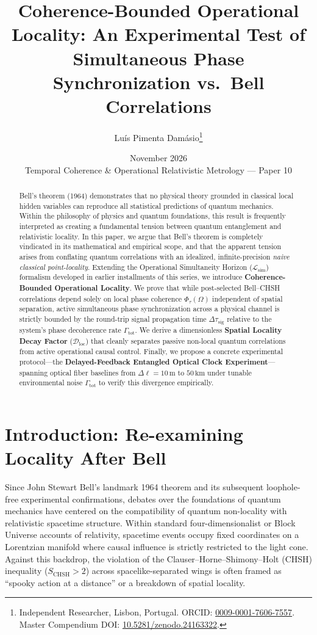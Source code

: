 \documentclass[11pt,a4paper]{article}
\title{\textbf{Coherence-Bounded Operational Locality: An Experimental Test of Simultaneous Phase Synchronization vs.\ Bell Correlations}}
\author{
    Lu\'{i}s Pimenta Dam\'{a}sio\thanks{Independent Researcher, Lisbon, Portugal. ORCID: \href{https://orcid.org/0009-0001-7606-7557}{0009-0001-7606-7557}. Master Compendium DOI: \href{https://doi.org/10.5281/zenodo.24163322}{10.5281/zenodo.24163322}.}
}
\date{November 2026 \\ \small Temporal Coherence \& Operational Relativistic Metrology --- Paper 10}
\begin{document}
\maketitle

\begin{abstract}
Bell's theorem (1964) demonstrates that no physical theory grounded in classical local hidden variables can reproduce all statistical predictions of quantum mechanics. Within the philosophy of physics and quantum foundations, this result is frequently interpreted as creating a fundamental tension between quantum entanglement and relativistic locality. In this paper, we argue that Bell's theorem is completely vindicated in its mathematical and empirical scope, and that the apparent tension arises from conflating quantum correlations with an idealized, infinite-precision \emph{naive classical point-locality}. Extending the Operational Simultaneity Horizon ($\mathcal{L}_{\mathrm{sim}}$) formalism developed in earlier installments of this series, we introduce \textbf{Coherence-Bounded Operational Locality}. We prove that while post-selected Bell--CHSH correlations depend solely on local phase coherence $\Phi_\tau(\Omega)$ independent of spatial separation, active simultaneous phase synchronization across a physical channel is strictly bounded by the round-trip signal propagation time $\Delta\tau_{\mathrm{sig}}$ relative to the system's phase decoherence rate $\Gamma_{\mathrm{tot}}$. We derive a dimensionless \textbf{Spatial Locality Decay Factor} ($\mathcal{D}_{\mathrm{loc}}$) that cleanly separates passive non-local quantum correlations from active operational causal control. Finally, we propose a concrete experimental protocol---the \textbf{Delayed-Feedback Entangled Optical Clock Experiment}---spanning optical fiber baselines from $\Delta\ell = 10\,\mathrm{m}$ to $50\,\mathrm{km}$ under tunable environmental noise $\Gamma_{\mathrm{tot}}$ to verify this divergence empirically.
\end{abstract}

\section{Introduction: Re-examining Locality After Bell}

Since John Stewart Bell's landmark 1964 theorem and its subsequent loophole-free experimental confirmations, debates over the foundations of quantum mechanics have centered on the compatibility of quantum non-locality with relativistic spacetime structure. Within standard four-dimensionalist or Block Universe accounts of relativity, spacetime events occupy fixed coordinates on a Lorentzian manifold where causal influence is strictly restricted to the light cone. Against this backdrop, the violation of the Clauser--Horne--Shimony--Holt (CHSH) inequality ($S_{\mathrm{CHSH}} > 2$) across spacelike-separated wings is often framed as ``spooky action at a distance'' or a breakdown of spatial locality.
\end{document}
